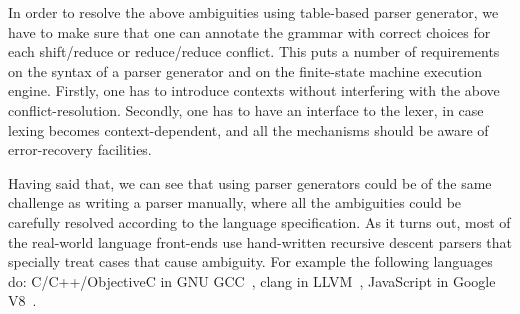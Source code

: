 In order to resolve the above ambiguities using table-based parser generator,
we have to make sure that one can annotate the grammar with correct choices for
each shift/reduce or reduce/reduce conflict. This puts a number of requirements
on the syntax of a parser generator and on the finite-state machine execution
engine.  Firstly, one has to introduce contexts without interfering with the
above conflict-resolution.  Secondly, one has to have an interface to the lexer,
in case lexing becomes context-dependent, and all the mechanisms should be aware 
of error-recovery facilities.

Having said that, we can see that using parser generators could be of
the same challenge as writing a parser manually, where all the
ambiguities could be carefully resolved according to the language
specification.  As it turns out, most of the real-world language
front-ends use hand-written recursive descent parsers that specially
treat cases that cause ambiguity.  For example the following languages do:
C/C++/ObjectiveC in GNU GCC~\cite{gcc}, clang in LLVM~\cite{clang}, 
JavaScript in Google V8~\cite{v8}.

